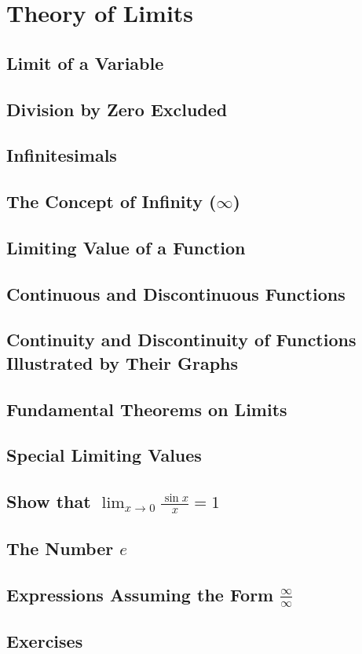 \chapter{Theory of Limits}
\label{ch:03}

\section{Limit of a Variable}
\label{sec:03:01}

\section{Division by Zero Excluded}
\label{sec:03:02}

\section{Infinitesimals}
\label{sec:03:03}

\section{The Concept of Infinity ($\infty$)}
\label{sec:03:04}

\section{Limiting Value of a Function}
\label{sec:03:05}

\section{Continuous and Discontinuous Functions}
\label{sec:03:06}

\section[Continuity and Discontinuity Illustrated with Graphs]{Continuity and Discontinuity of Functions Illustrated by Their Graphs}
\label{sec:03:07}

\section{Fundamental Theorems on Limits}
\label{sec:03:08}

\section{Special Limiting Values}
\label{sec:03:09}

\section{Show that $\lim_{x \rightarrow 0} \frac{\sin x}{x} = 1$}
\label{sec:03:10}

\section{The Number $e$}
\label{sec:03:11}

\section{Expressions Assuming the Form $\frac{\infty}{\infty}$}
\label{sec:03:12}

\section{Exercises}
\label{sec:03:13}
